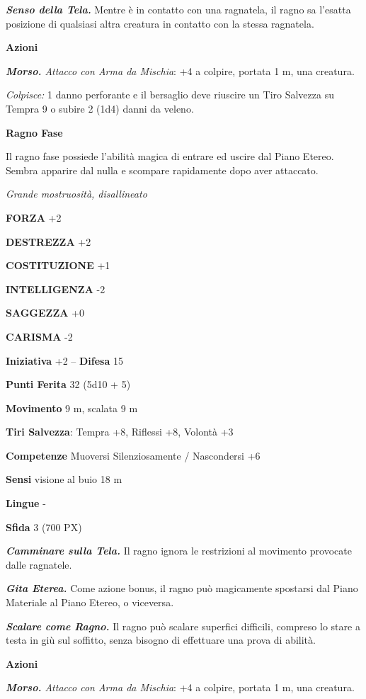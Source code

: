 \begin{multicols}{2}
\textit{\textbf{Senso della Tela.}} Mentre è in contatto con una ragnatela, il ragno sa l'esatta posizione di qualsiasi altra creatura in contatto con la stessa ragnatela.

\textbf{Azioni}

\textit{\textbf{Morso.} Attacco con Arma da Mischia}: +4 a colpire, portata 1 m, una creatura.

\textit{Colpisce:} 1 danno perforante e il bersaglio deve riuscire un Tiro Salvezza su Tempra 9 o subire 2 (1d4) danni da veleno.

\medskip\textbf{Ragno Fase}

Il ragno fase possiede l'abilità magica di entrare ed uscire dal Piano Etereo. Sembra apparire dal nulla e scompare rapidamente dopo aver attaccato.

\textit{Grande mostruosità, disallineato}

\textbf{FORZA} +2

\textbf{DESTREZZA} +2

\textbf{COSTITUZIONE} +1

\textbf{INTELLIGENZA} -2

\textbf{SAGGEZZA} +0

\textbf{CARISMA} -2

\textbf{Iniziativa} +2 -- \textbf{Difesa} 15

\textbf{Punti Ferita} 32 (5d10 + 5)

\textbf{Movimento} 9 m, scalata 9 m

\textbf{Tiri Salvezza}: Tempra +8, Riflessi +8, Volontà +3

\textbf{Competenze} Muoversi Silenziosamente / Nascondersi +6

\textbf{Sensi} visione al buio 18 m

\textbf{Lingue} -

\textbf{Sfida} 3 (700 PX)

\textit{\textbf{Camminare sulla Tela.}} Il ragno ignora le restrizioni al movimento provocate dalle ragnatele.

\textit{\textbf{Gita Eterea.}} Come azione bonus, il ragno può magicamente spostarsi dal Piano Materiale al Piano Etereo, o viceversa.

\textit{\textbf{Scalare come Ragno.}} Il ragno può scalare superfici difficili, compreso lo stare a testa in giù sul soffitto, senza bisogno di effettuare una prova di abilità.

\textbf{Azioni}

\textit{\textbf{Morso.} Attacco con Arma da Mischia}: +4 a colpire, portata 1 m, una creatura.


\end{multicols}
